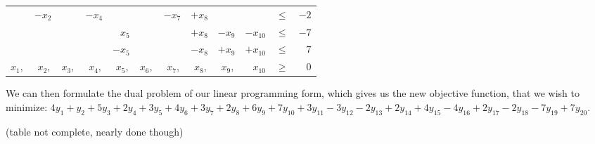 \documentclass[11pt,a4paper,english]{article}
\begin{document}
\begin{table}[H]
\begin{tabular}{rrrrrrrrrrrr}
   ~      & $-x_2$ & ~      & $-x_4$ & ~      & ~      & $-x_7$ & $+x_8$ & ~      & ~         & $\leq$ & $-2$ \\
   ~      & ~      & ~      & ~      & $x_5$  & ~      & ~      & $+x_8$ & $-x_9$ & $-x_{10}$ & $\leq$ & $-7$ \\
   ~      & ~      & ~      & ~      & $-x_5$ & ~      & ~      & $-x_8$ & $+x_9$ & $+x_{10}$ & $\leq$ & $7$  \\
   $x_1,$ & $x_2,$ & $x_3,$ & $x_4,$ & $x_5,$ & $x_6,$ & $x_7,$ & $x_8,$ & $x_9,$ & $x_{10}$  & $\geq$ & $0$  \\
   \end{tabular}
\end{table}

We can then formulate the dual problem of our linear programming form, which  
gives us the new objective function, that we wish to minimize: $4y_1 + y_2 +  
5y_3 + 2y_4 + 3y_5 + 4y_6 + 3y_7 + 2y_8 + 6y_9 + 7y_{10} + 3y_{11} - 3y_{12}  
- 2y_{13} + 2y_{14} + 4y_{15} - 4y_{16} + 2y_{17} - 2y_{18} - 7y_{19} +       
7y_{20}$.                                                                     

(table not complete, nearly done though)
\end{document}
